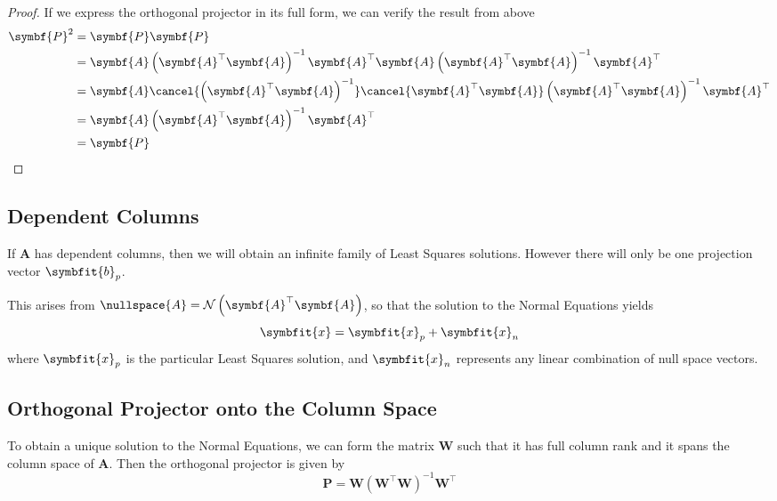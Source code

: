 \documentclass{article}
\begin{document}
\begin{proof}
    If we express the orthogonal projector in its full form, we can verify the result from above
    \begin{align*}
        \symbf{P}^2 & = \symbf{P} \symbf{P} \\
                    & = \symbf{A} \left( \symbf{A}^\top \symbf{A} \right)^{-1} \symbf{A}^\top \symbf{A} \left( \symbf{A}^\top \symbf{A} \right)^{-1} \symbf{A}^\top \\
                    & = \symbf{A} \cancel{\left( \symbf{A}^\top \symbf{A} \right)^{-1}} \cancel{\symbf{A}^\top \symbf{A}} \left( \symbf{A}^\top \symbf{A} \right)^{-1} \symbf{A}^\top \\
                    & = \symbf{A} \left( \symbf{A}^\top \symbf{A} \right)^{-1} \symbf{A}^\top \\
                    & = \symbf{P}
    \end{align*}
\end{proof}
\subsection{Dependent Columns}
If \(\symbf{A}\) has dependent columns, then we will obtain an infinite family of Least 
Squares solutions. However there will only be one projection vector \(\symbfit{b}_p\).

This arises from \(\nullspace{A} = \mathcal{N}\left(\symbf{A}^\top \symbf{A}\right)\), so that
the solution to the Normal Equations yields
\begin{equation*}
    \symbfit{x} = \symbfit{x}_p + \symbfit{x}_n
\end{equation*}
where \(\symbfit{x}_p\) is the particular Least Squares solution, and \(\symbfit{x}_n\) represents
any linear combination of null space vectors.
\subsection{Orthogonal Projector onto the Column Space}
To obtain a unique solution to the Normal Equations, we can form the matrix \(\symbf{W}\)
such that it has full column rank and it spans the column space of \(\symbf{A}\). 
Then the orthogonal projector is given by
\begin{equation*}
    \symbf{P} = \symbf{W} \left( \symbf{W}^\top \symbf{W} \right)^{-1} \symbf{W}^\top
\end{equation*}
\end{document}
